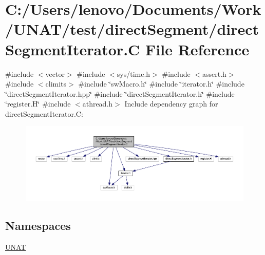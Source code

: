 \hypertarget{test_2directSegment_2directSegmentIterator_8C}{}\section{C\+:/\+Users/lenovo/\+Documents/\+Work/\+U\+N\+A\+T/test/direct\+Segment/direct\+Segment\+Iterator.C File Reference}
\label{test_2directSegment_2directSegmentIterator_8C}
{\ttfamily \#include $<$vector$>$}\newline
{\ttfamily \#include $<$sys/time.\+h$>$}\newline
{\ttfamily \#include $<$assert.\+h$>$}\newline
{\ttfamily \#include $<$climits$>$}\newline
{\ttfamily \#include \char`\"{}sw\+Macro.\+h\char`\"{}}\newline
{\ttfamily \#include \char`\"{}iterator.\+h\char`\"{}}\newline
{\ttfamily \#include \char`\"{}direct\+Segment\+Iterator.\+hpp\char`\"{}}\newline
{\ttfamily \#include \char`\"{}direct\+Segment\+Iterator.\+h\char`\"{}}\newline
{\ttfamily \#include \char`\"{}register.\+H\char`\"{}}\newline
{\ttfamily \#include $<$athread.\+h$>$}\newline
Include dependency graph for direct\+Segment\+Iterator.\+C\+:
\nopagebreak
\begin{figure}[H]
\begin{center}
\leavevmode
\includegraphics[width=350pt]{test_2directSegment_2directSegmentIterator_8C__incl}
\end{center}
\end{figure}
\subsection*{Namespaces}
\begin{DoxyCompactItemize}
\item 
 \mbox{\hyperlink{namespaceUNAT}{U\+N\+AT}}
\end{DoxyCompactItemize}
